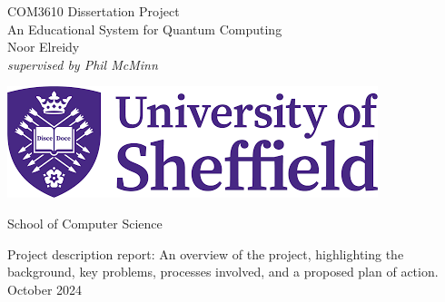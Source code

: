 
\begin{titlepage}
    \begin{center}
        \vspace*{1cm}
        \LARGE{COM3610 Dissertation Project }
        \vspace{3cm}
        \\
        \Huge {An Educational System for Quantum Computing}
        \\
        \vspace{2cm}
        {\LARGE Noor Elreidy\\}
        {\LARGE \textit{supervised by Phil McMinn}\\}
        
        \vspace{2cm}
       \includegraphics[scale=0.5]{logos/download.png}

        {\Huge School of Computer Science\\}

        \vspace{2cm}

        \Large Project description report: An overview of the project, highlighting the background, key problems,
        processes involved, and a proposed plan of action. \\

        \vspace{1cm}
        \LARGE October 2024




        
    \end{center}
    
 

\end{titlepage}